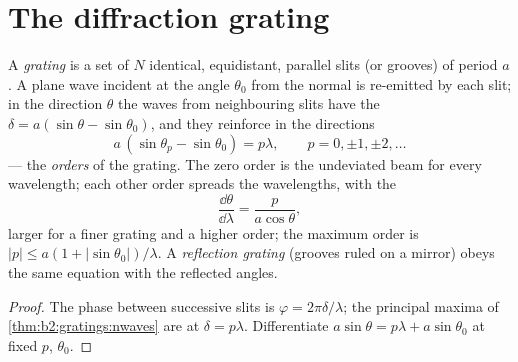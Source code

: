 \section{The diffraction grating}

\begin{proposition}\label{prop:b2:gratings:equation}
A \emph{grating} is a set of $N$ identical, equidistant, parallel slits
(or grooves) of period $a$. A plane wave incident at the angle $\theta_0$
from the normal is re-emitted by each slit; in the direction $\theta$ the
waves from neighbouring slits have the  $\delta = a(\sin\theta
- \sin\theta_0)$, and they reinforce in the directions
\[
a\,(\sin\theta_p - \sin\theta_0) = p\lambda , \qquad p = 0, \pm1, \pm2, \dots
\]
--- the \emph{orders} of the grating. The zero order is the undeviated
beam for every wavelength; each other order spreads the wavelengths,
with the \emph{}
\[
\frac{\dd\theta}{\dd\lambda} = \frac{p}{a\cos\theta} ,
\]
larger for a finer grating and a higher order; the maximum order is
$|p| \le a(1 + |\sin\theta_0|)/\lambda$. A \emph{reflection grating} (grooves ruled
on a mirror) obeys the same equation with the reflected angles.
\end{proposition}

\begin{proof}
The phase between successive slits is $\varphi = 2\pi\delta/\lambda$; the principal
maxima of \cref{thm:b2:gratings:nwaves} are at $\delta = p\lambda$.
Differentiate $a\sin\theta = p\lambda + a\sin\theta_0$ at fixed $p$, $\theta_0$.
\end{proof}

